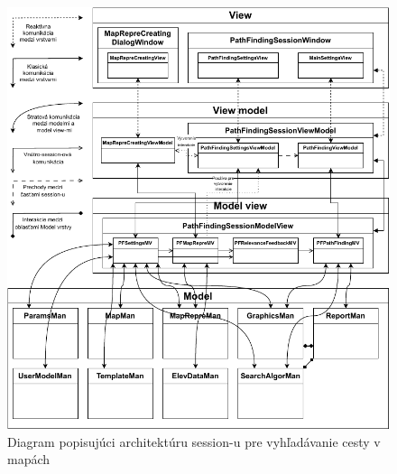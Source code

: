 \begin{figure}[h]\centering
\includegraphics[]{img/session_vyhladavania_cesty}
\caption{Diagram popisujúci architektúru session-u pre vyhľadávanie cesty v mapách} 
\label{obr04:session_vyhladavania_cesty}
\end{figure}

